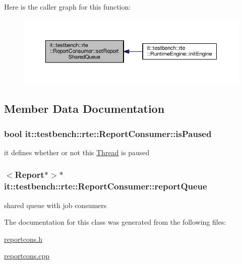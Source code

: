 Here is the caller graph for this function\-:
\nopagebreak
\begin{figure}[H]
\begin{center}
\leavevmode
\includegraphics[width=350pt]{de/d2c/classit_1_1testbench_1_1rte_1_1ReportConsumer_a8d786ee688355cf6dc45e7e0d417b6ca_icgraph}
\end{center}
\end{figure}




\subsection{Member Data Documentation}
\hypertarget{classit_1_1testbench_1_1rte_1_1ReportConsumer_a700e6c26754c6fc270aa8aef81bef405}{
\subsubsection[{is\-Paused}]{\setlength{\rightskip}{0pt plus 5cm}bool it\-::testbench\-::rte\-::\-Report\-Consumer\-::is\-Paused\hspace{0.3cm}{\ttfamily [private]}}}\label{de/d2c/classit_1_1testbench_1_1rte_1_1ReportConsumer_a700e6c26754c6fc270aa8aef81bef405}
it defines whether or not this \hyperlink{classit_1_1testbench_1_1rte_1_1Thread}{Thread} is paused \hypertarget{classit_1_1testbench_1_1rte_1_1ReportConsumer_a3567bb28dc6b59ee978216fb89037a13}{
\subsubsection[{report\-Queue}]{$<${\bf Report}$\ast$$>$$\ast$ it\-::testbench\-::rte\-::\-Report\-Consumer\-::report\-Queue\hspace{0.3cm}{\ttfamily [private]}}}\label{de/d2c/classit_1_1testbench_1_1rte_1_1ReportConsumer_a3567bb28dc6b59ee978216fb89037a13}
shared queue with job consumers 

The documentation for this class was generated from the following files\-:\begin{DoxyCompactItemize}
\item 
\hyperlink{reportcons_8h}{reportcons.\-h}\item 
\hyperlink{reportcons_8cpp}{reportcons.\-cpp}\end{DoxyCompactItemize}
